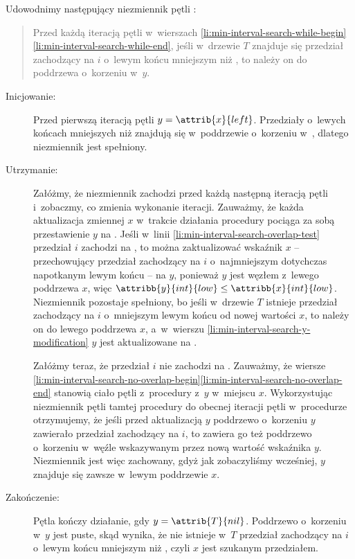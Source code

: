 Udowodnimy następujący niezmiennik pętli :
\begin{quote}
Przed każdą iteracją pętli  w~wierszach \ref{li:min-interval-search-while-begin}\nbendash\ref{li:min-interval-search-while-end}, jeśli w~drzewie $T$ znajduje się przedział zachodzący na $i$ o~lewym końcu mniejszym niż , to należy on do poddrzewa o~korzeniu w~$y$.
\end{quote}
\begin{description}
	\item[Inicjowanie:] Przed pierwszą iteracją pętli  $y=\attrib{x}{left}$.
Przedziały o~lewych końcach mniejszych niż  znajdują się w~poddrzewie o~korzeniu w~, dlatego niezmiennik jest spełniony.
	\item[Utrzymanie:] Załóżmy, że niezmiennik zachodzi przed każdą następną iteracją pętli  i~zobaczmy, co zmienia wykonanie iteracji.
Zauważmy, że każda aktualizacja zmiennej $x$ w~trakcie działania procedury pociąga za sobą przestawienie $y$ na .
Jeśli w~linii \ref{li:min-interval-search-overlap-test} przedział $i$ zachodzi na , to można zaktualizować wskaźnik $x$ -- przechowujący przedział zachodzący na $i$ o~najmniejszym dotychczas napotkanym lewym końcu -- na $y$, ponieważ $y$ jest węzłem z~lewego poddrzewa $x$, więc $\attribb{y}{int}{low}\le\attribb{x}{int}{low}$.
Niezmiennik pozostaje spełniony, bo jeśli w~drzewie $T$ istnieje przedział zachodzący na $i$ o~mniejszym lewym końcu od nowej wartości $x$, to należy on do lewego poddrzewa $x$, a~w~wierszu \ref{li:min-interval-search-y-modification} $y$ jest aktualizowane na .

Załóżmy teraz, że przedział $i$ nie zachodzi na .
Zauważmy, że wiersze \ref{li:min-interval-search-no-overlap-begin}\nbendash\ref{li:min-interval-search-no-overlap-end} stanowią ciało pętli  z~procedury  z~$y$ w~miejscu $x$.
Wykorzystując niezmiennik pętli  tamtej procedury do obecnej iteracji pętli w~procedurze  otrzymujemy, że jeśli przed aktualizacją $y$ poddrzewo o~korzeniu $y$ zawierało przedział zachodzący na $i$, to zawiera go też poddrzewo o~korzeniu w~węźle wskazywanym przez nową wartość wskaźnika $y$.
Niezmiennik jest więc zachowany, gdyż jak zobaczyliśmy wcześniej, $y$ znajduje się zawsze w~lewym poddrzewie $x$.
	\item[Zakończenie:] Pętla kończy działanie, gdy $y=\attrib{T}{nil}$.
Poddrzewo o~korzeniu w~$y$ jest puste, skąd wynika, że nie istnieje w~$T$ przedział zachodzący na $i$ o~lewym końcu mniejszym niż , czyli $x$ jest szukanym przedziałem.
\end{description}

